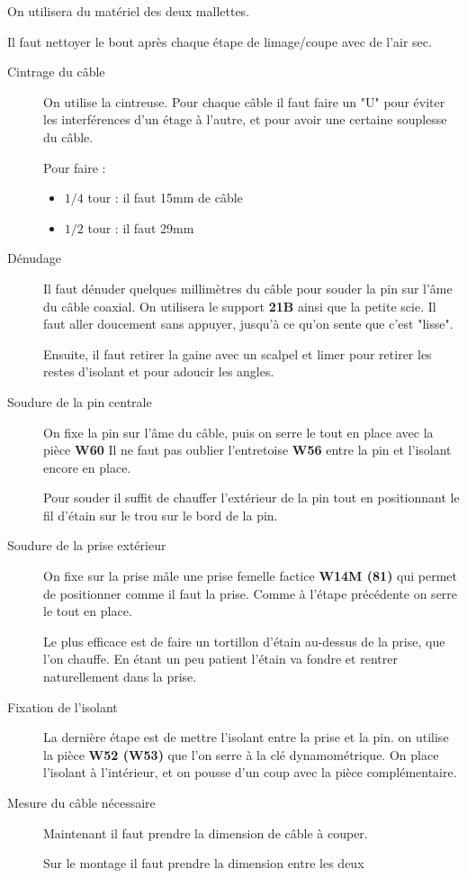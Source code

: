 \documentclass[a4paper,11pt]{article}
\begin{document}
On utilisera du matériel des deux mallettes.

Il faut nettoyer le bout après chaque étape de limage/coupe avec de l'air sec.

\begin{description}
    \item[Cintrage du câble] On utilise la cintreuse. Pour chaque câble il faut faire un "U" pour éviter les interférences d'un étage à l'autre, et pour avoir une certaine souplesse du câble.
    
    Pour faire : 
    \begin{itemize}
        \item $1/4$ tour : il faut 15mm de câble
        \item $1/2$ tour : il faut 29mm
    \end{itemize}
     \item[Dénudage] Il faut dénuder quelques millimètres du câble pour souder la pin sur l'âme du câble coaxial.
     On utilisera le support \textbf{21B} ainsi que la petite scie. Il faut aller doucement sans appuyer, jusqu'à ce qu'on sente que c'est "lisse".
     
     Ensuite, il faut retirer la gaine avec un scalpel et limer pour retirer les restes d'isolant et pour adoucir les angles.
     \item[Soudure de la pin centrale] On fixe la pin sur l'âme du câble, puis on serre le tout en place avec la pièce \textbf{W60} Il ne faut pas oublier l'entretoise \textbf{W56} entre la pin et l'isolant encore en place.
     
     Pour souder il suffit de chauffer l'extérieur de la pin tout en positionnant le fil d'étain sur le trou sur le bord de la pin.
     \item[Soudure de la prise extérieur] On fixe sur la prise mâle une prise femelle factice \textbf{W14M (81)} qui permet de positionner comme il faut la prise. Comme à l'étape précédente on serre le tout en place.
     
     Le plus efficace est de faire un tortillon d'étain au-dessus de la prise, que l'on chauffe. En étant un peu patient l'étain va fondre et rentrer naturellement dans la prise.
     \item[Fixation de l'isolant] La dernière étape est de mettre l'isolant entre la prise et la pin. on utilise la pièce \textbf{W52 (W53)}
     que l'on serre à la clé dynamométrique. On place l'isolant à l'intérieur, et on pousse d'un coup avec la pièce complémentaire.
     
     \item[Mesure du câble nécessaire] Maintenant il faut prendre la dimension de câble à couper.
     
     Sur le montage il faut prendre la dimension entre les deux 
     
\end{description}
\end{document}
